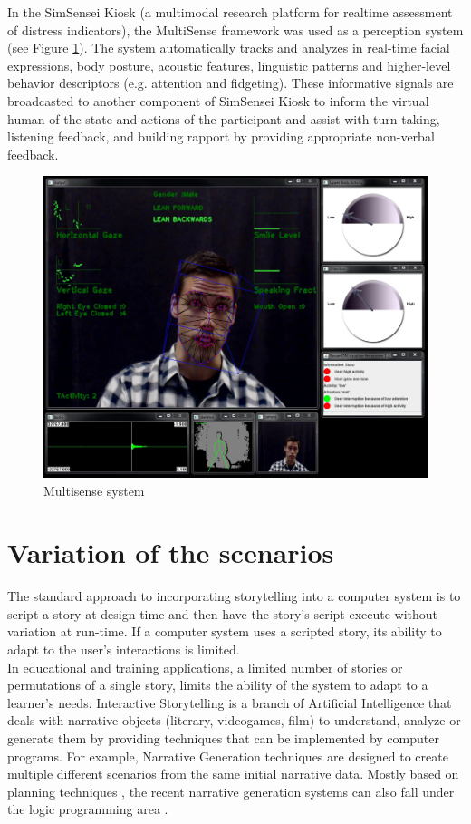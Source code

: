 \documentclass[11pt]{article}
\begin{document}
In the SimSensei Kiosk \cite{DeVault14} (a multimodal research platform for realtime assessment of distress indicators), the MultiSense framework was used as a perception system (see Figure \ref{Figure visio}). The system automatically tracks and analyzes in real-time facial expressions, body posture, acoustic features, linguistic patterns and higher-level behavior descriptors (e.g. attention and fidgeting). These informative signals are broadcasted to another component of SimSensei Kiosk to inform the virtual human of the state and actions of the participant and assist with turn taking, listening feedback, and building rapport by providing appropriate non-verbal feedback. \\
\begin{figure}[h]
   	\centerline{\includegraphics[scale=0.28]{./images/simsensei}}
   	\caption{\label{Figure visio} Multisense system \cite{DeVault14}}
\end{figure}
\section{Variation of the scenarios}
The standard approach to incorporating storytelling into a computer system is to script a story at design time and then have the story's script execute without variation at run-time. If a computer system uses a scripted story, its ability to adapt to the user's interactions is limited. \cite{Riedl10}\\

In educational and training applications, a limited number of stories or permutations of a single story, limits the ability of the system to adapt to a learner's needs. Interactive Storytelling is a branch of Artificial Intelligence that deals with narrative objects (literary, videogames, film) to understand, analyze or generate them by providing techniques that can be implemented by computer programs. For example, Narrative Generation techniques are designed to create multiple different scenarios from the same initial narrative data. Mostly based on planning techniques \cite{Young99}, the recent narrative generation systems can also fall under the logic programming area \cite{Bosser10}.
\end{document}
